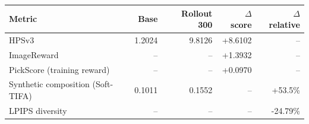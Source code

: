 \begin{tabularx}{\textwidth}{@{}Xrrrr@{}}
\toprule
Metric & Base & Rollout 300 & $\Delta$ score & $\Delta$ relative \\
\midrule
HPSv3 & 1.2024 & 9.8126 & +8.6102 & -- \\
ImageReward & -- & -- & +1.3932 & -- \\
PickScore (training reward) & -- & -- & +0.0970 & -- \\
Synthetic composition (Soft-TIFA) & 0.1011 & 0.1552 & -- & +53.5\% \\
LPIPS diversity & -- & -- & -- & -24.79\% \\
\bottomrule
\end{tabularx}
